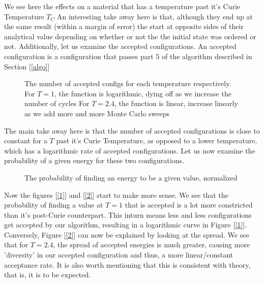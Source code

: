 \documentclass{article}
\begin{document}
We see here the effects on a material that has a temperature past it's Curie Temperature $T_C$\newline
An interesting take away here is that, although they end up at the same result (within a margin of error) the start at opposite sides of their analytical value depending on whether or not the the initial state was ordered or not.
\newpage
Additionally, let us examine the accepted configurations. An accepted configuration is a configuration that passes part 5 of the algorithm described in Section [\ref{algo}]
\newline
\begin{figure}[ht!]
\centering
{}
\caption{The number of accepted configs for each temperature respectively. \newline
For $T=1$, the function is logarithmic, dying off as we increase the number of cycles \newline
For $T=2.4$, the function is linear, increase linearly as we add more and more Monte Carlo sweeps}
\end{figure}
The main take away here is that the number of accepted configurations is close to constant for a $T$ past it's Curie Temperature, as opposed to a lower temperature, which has a logarithmic rate of accepted configurations.
\newline
Let us now examine the probability of a given energy for these two configurations.
\begin{figure}[ht!]
\centering
{}
\caption{The probability of finding an energy to be a given value, normalized}
\end{figure} \newline
Now the figures [\ref{1}] and [\ref{2}] start to make more sense. We see that the probability of finding a value at $T=1$ that is accepted is a lot more constricted than it's post-Curie counterpart. This inturn means less and less configurations get accepted by our algorithm, resulting in a logarithmic curve in Figure [\ref{1}]. \newline
Conversely, Figure [\ref{2}] can now be explained by looking at the spread. We see that for $T=2.4$, the spread of accepted energies is much greater, causing more 'diversity' in our accepted configuration and thus, a more linear/constant acceptance rate. It is also worth mentioning that this is consistent with theory, that is, it is to be expected.
\end{document}
